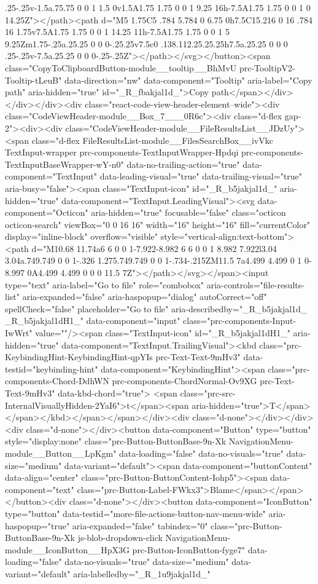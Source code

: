 {{{{{.25-.25v-1.5a.75.75 0 0 1 1.5 0v1.5A1.75 1.75 0 0 1 9.25 16h-7.5A1.75 1.75 0 0 1 0 14.25Z"></path><path d="M5 1.75C5 .784 5.784 0 6.75 0h7.5C15.216 0 16 .784 16 1.75v7.5A1.75 1.75 0 0 1 14.25 11h-7.5A1.75 1.75 0 0 1 5 9.25Zm1.75-.25a.25.25 0 0 0-.25.25v7.5c0 .138.112.25.25.25h7.5a.25.25 0 0 0 .25-.25v-7.5a.25.25 0 0 0-.25-.25Z"></path></svg></button><span class="CopyToClipboardButton-module__tooltip__BhMvU prc-TooltipV2-Tooltip-tLeuB" data-direction="nw" data-component="Tooltip" aria-label="Copy path" aria-hidden="true" id="_R_fbakjal1d_">Copy path</span></div></div></div><div class="react-code-view-header-element--wide"><div class="CodeViewHeader-module__Box_7___0R6c"><div class="d-flex gap-2"><div><div class="CodeViewHeader-module__FileResultsList__JDzUy"><span class="d-flex FileResultsList-module__FilesSearchBox__ivVkc TextInput-wrapper prc-components-TextInputWrapper-Hpdqi prc-components-TextInputBaseWrapper-wY-n0" data-no-trailing-action="true" data-component="TextInput" data-leading-visual="true" data-trailing-visual="true" aria-busy="false"><span class="TextInput-icon" id="_R_b5jakjal1d_" aria-hidden="true" data-component="TextInput.LeadingVisual"><svg data-component="Octicon" aria-hidden="true" focusable="false" class="octicon octicon-search" viewBox="0 0 16 16" width="16" height="16" fill="currentColor" display="inline-block" overflow="visible" style="vertical-align:text-bottom"><path d="M10.68 11.74a6 6 0 0 1-7.922-8.982 6 6 0 0 1 8.982 7.922l3.04 3.04a.749.749 0 0 1-.326 1.275.749.749 0 0 1-.734-.215ZM11.5 7a4.499 4.499 0 1 0-8.997 0A4.499 4.499 0 0 0 11.5 7Z"></path></svg></span><input type="text" aria-label="Go to file" role="combobox" aria-controls="file-results-list" aria-expanded="false" aria-haspopup="dialog" autoCorrect="off" spellCheck="false" placeholder="Go to file" aria-describedby="_R_b5jakjal1d_ _R_b5jakjal1dH1_" data-component="input" class="prc-components-Input-IwWrt" value=""/><span class="TextInput-icon" id="_R_b5jakjal1dH1_" aria-hidden="true" data-component="TextInput.TrailingVisual"><kbd class="prc-KeybindingHint-KeybindingHint-qpYIs prc-Text-Text-9mHv3" data-testid="keybinding-hint" data-component="KeybindingHint"><span class="prc-components-Chord-DdhWN prc-components-ChordNormal-Ov9XG prc-Text-Text-9mHv3" data-kbd-chord="true"> <span class="prc-src-InternalVisuallyHidden-2YaI6">t</span><span aria-hidden="true">T</span></span></kbd></span></span></div><div class="d-none"></div></div><div class="d-none"></div><button data-component="Button" type="button" style="display:none" class="prc-Button-ButtonBase-9n-Xk NavigationMenu-module__Button__LpKgm" data-loading="false" data-no-visuals="true" data-size="medium" data-variant="default"><span data-component="buttonContent" data-align="center" class="prc-Button-ButtonContent-Iohp5"><span data-component="text" class="prc-Button-Label-FWkx3">Blame</span></span></button><div class="d-none"></div><button data-component="IconButton" type="button" data-testid="more-file-actions-button-nav-menu-wide" aria-haspopup="true" aria-expanded="false" tabindex="0" class="prc-Button-ButtonBase-9n-Xk js-blob-dropdown-click NavigationMenu-module__IconButton__HpX3G prc-Button-IconButton-fyge7" data-loading="false" data-no-visuals="true" data-size="medium" data-variant="default" aria-labelledby="_R_1u9jakjal1d_" }}}}}
